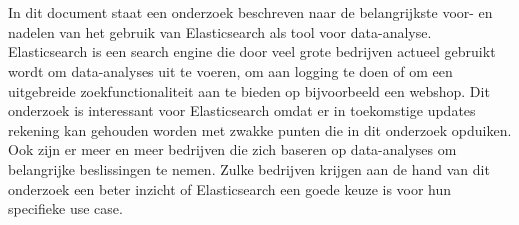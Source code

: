 




\chapter*{}

In dit document staat een onderzoek beschreven naar de belangrijkste voor- en nadelen van het gebruik van
Elasticsearch als tool voor data-analyse. Elasticsearch is een search engine die door veel grote bedrijven actueel gebruikt wordt om data-analyses uit te voeren, om aan logging te doen of om een uitgebreide zoekfunctionaliteit aan te bieden op bijvoorbeeld een webshop. Dit onderzoek is interessant voor Elasticsearch omdat er in toekomstige updates rekening kan gehouden worden met zwakke punten die in dit onderzoek opduiken. Ook zijn er meer en meer bedrijven die zich baseren op data-analyses om belangrijke beslissingen te nemen. Zulke bedrijven krijgen aan de hand van dit onderzoek een beter inzicht of Elasticsearch een goede keuze is voor hun specifieke use case.

